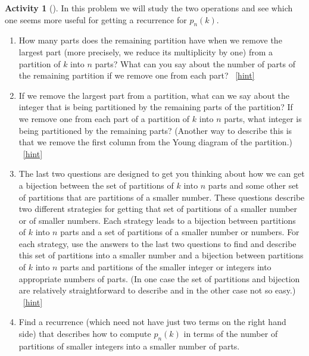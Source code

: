 \documentclass[10pt,]{book}
\theoremstyle{plain}
\theoremstyle{definition}
\theoremstyle{definition}
\theoremstyle{definition}
\newtheorem{activity}[project]{Activity}
\numberwithin{equation}{chapter}
\begin{document}
\begin{activity}[]\label{numberpartitionrecurrence}
\hypertarget{p-726}{}%
In this problem we will study the two operations and see which one seems more useful for getting a recurrence for \(p_n(k)\).%
\begin{enumerate}[font=\bfseries,label=(\alph*),ref=\alph*]
\item\label{task-148} \hypertarget{p-727}{}%
How many parts does the remaining partition have when we remove the largest part (more precisely, we reduce its multiplicity by one) from a partition of \(k\) into \(n\) parts?  What can you say about the number of parts of the remaining partition if we remove one from each part?%
~\hfill{\tiny\hyperlink{a-153.a}{[hint]}\hypertarget{q-153.a}{}}\item\label{task-149} \hypertarget{p-730}{}%
If we remove the largest part from a partition, what can we say about the integer that is being partitioned by the remaining parts of the partition? If we remove one from each part of a partition of \(k\) into \(n\) parts, what integer is being partitioned by the remaining parts? (Another way to describe this is that we remove the first column from the Young diagram of the partition.)%
~\hfill{\tiny\hyperlink{a-153.b}{[hint]}\hypertarget{q-153.b}{}}\item\label{task-150} \hypertarget{p-733}{}%
The last two questions are designed to get you thinking about how we can get a bijection between the set of partitions of \(k\) into \(n\) parts and some other set of partitions that are partitions of a smaller number.  These questions describe two different strategies for getting that set of partitions of a smaller number or of smaller numbers.  Each strategy leads to a bijection between partitions of \(k\) into \(n\) parts and a set of partitions of a smaller number or numbers.  For each strategy, use the answers to the last two questions to find and describe this set of partitions into a smaller number and a bijection between partitions of \(k\) into \(n\) parts and partitions of the smaller integer or integers into appropriate numbers of parts. (In one case the set of partitions and bijection are relatively straightforward to describe and in the other case not so easy.)%
~\hfill{\tiny\hyperlink{a-153.c}{[hint]}\hypertarget{q-153.c}{}}\item\label{task-151} \hypertarget{p-737}{}%
Find a recurrence (which need not have just two terms on the right hand side) that describes how to compute \(p_n(k)\) in terms of the number of partitions of smaller integers into a smaller number of parts.%

\end{enumerate}
\end{activity}
\end{document}
